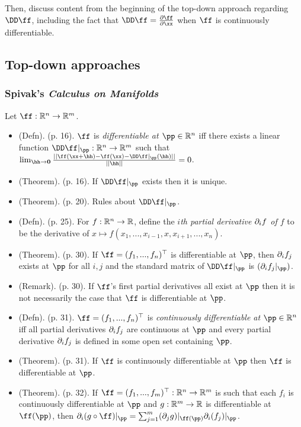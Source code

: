 Then, discuss content from the beginning of the top-down approach regarding $\DD \ff$, including the fact that $\DD \ff = \frac{\pd \ff}{\pd \xx}$ when $\ff$ is continuously differentiable.

\subsection*{Top-down approaches}

\subsubsection*{Spivak's \textit{Calculus on Manifolds}}

Let $\ff:\R^n \rightarrow \R^m$.

\begin{itemize}
    \item (Defn). (p. 16). $\ff$ is \textit{differentiable at $\pp \in \R^n$} iff there exists a linear function $\DD \ff|_\pp:\R^n \rightarrow \R^m$ such that $\lim_{\hh \rightarrow \mathbf{0}} \frac{||\ff(\xx + \hh) - \ff(\xx) - \DD \ff|_\pp(\hh)||}{||\hh||} = 0$.
    \item (Theorem). (p. 16). If $\DD \ff|_\pp$ exists then it is unique.
    \item (Theorem). (p. 20). Rules about $\DD \ff|_\pp$.
    \item (Defn). (p. 25). For $f:\mathbb{R}^n \rightarrow \mathbb{R}$, define the \textit{$i$th partial derivative $\partial_i f$  of $f$} to be the derivative of $x \mapsto f(x_1, ..., x_{i - 1}, x, x_{i + 1}, ..., x_n)$.
    \item (Theorem). (p. 30). If $\ff = (f_1, ..., f_n)^\top$ is differentiable at $\pp$, then $\partial_i f_j$ exists at $\pp$ for all $i, j$ and the standard matrix of $\DD \ff|_\pp$ is $(\pd_i f_j|_\pp)$.
    \item (Remark). (p. 30). If $\ff$'s first partial derivatives all exist at $\pp$ then it is not necessarily the case that $\ff$ is differentiable at $\pp$.
    \item (Defn). (p. 31). $\ff = (f_1, ..., f_n)^\top$ is \textit{continuously differentiable at $\pp \in \R^n$} iff all partial derivatives $\partial_i f_j$ are continuous at $\pp$ and every partial derivative $\partial_i f_j$ is defined in some open set containing $\pp$.
    \item (Theorem). (p. 31). If $\ff$ is continuously differentiable at $\pp$ then $\ff$ is differentiable at $\pp$.
    \item (Theorem). (p. 32). If $\ff = (f_1, ..., f_m)^\top:\R^n \rightarrow \R^m$ is such that each $f_i$ is continuously differentiable at $\pp$ and $g:\mathbb{R}^m \rightarrow \mathbb{R}$ is differentiable at $\ff(\pp)$, then $\pd_i (g \circ \ff)|_\pp = \sum_{j = 1}^m (\pd_j g)|_{\ff(\pp)} \pd_i (f_j)|_\pp$.
\end{itemize}

